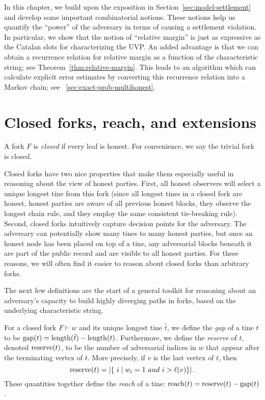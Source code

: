 
In this chapter, 
we build upon the exposition in Section~\ref{sec:model-settlement} 
and develop some important combinatorial notions. 
These notions help us quantify the ``power'' of the adversary 
in terms of causing a settlement violation. 
In particular, we show that the notion of ``relative margin'' is just as expressive 
as the Catalan slots for characterizing the UVP. 
An added advantage is that we can obtain a recurrence relation 
for relative margin as a function of the characteristic string; 
see Theorem~\ref{thm:relative-margin}. 
This leads to an algorithm which can calculate explicit error estimates by converting 
this recurrence relation into a Markov chain; see \Section~\ref{sec:exact-prob-multihonest}.


\section{Closed forks, reach, and extensions}
\begin{definition}
  A fork $F$ is \emph{closed} if every leaf is honest. For convenience, we say the trivial fork is closed.
\end{definition}
Closed forks have two nice properties that make them especially useful in reasoning about the view of honest parties.
First, 
all honest observers will select a unique longest tine from this fork 
(since all longest tines in a closed fork are honest, 
honest parties are aware of all previous honest blocks, 
they observe the longest chain rule, and they employ the same consistent tie-breaking rule).  
Second, 
closed forks intuitively capture decision points for the adversary.
The adversary can potentially show many tines to many honest parties, 
but once an honest node has been placed on top of 
a tine, any adversarial blocks beneath it are part of the public record and are visible to all honest parties. 
For these
reasons, we will often find it easier to reason about closed forks than arbitrary forks. %

The next few definitions are the start of a general toolkit for reasoning about an adversary's capacity to build highly diverging paths in forks, based on the underlying characteristic string.

\begin{definition}\label{def:gap-reserve-reach-mh}
For a closed fork $F \vdash w$ and its unique longest tine $\hat{t}$, we define the \emph{gap} of a tine $t$ to be $\operatorname{gap}(t)=\operatorname{length}(\hat{t})-\operatorname{length}(t)$.
Furthermore, we define the \emph{reserve} of $t$, denoted $\operatorname{reserve}(t)$, to be the number of adversarial indices in $w$ that appear after the terminating vertex of $t$. More precisely, if $v$ is the last vertex of $t$, then
\[
  \reserve(t)=|\{\ i \mid w_i=1 \ and \ i > \ell(v)\}|\,.
  \]
These quantities together define the \emph{reach} of a tine: $
\operatorname{reach}(t)=\operatorname{reserve}(t)-\operatorname{gap}(t)$.
\end{definition}

